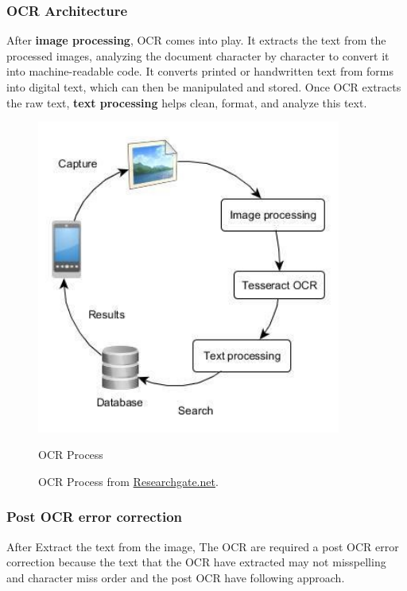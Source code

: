 \documentclass[12pt,oneside,openright,a4paper]{cpe-english-project}
\begin{document}
\subsubsection{OCR Architecture} After \textbf{image processing}, OCR comes into play. It extracts the text from the processed images, analyzing the document character by character to convert it into machine-readable code. It converts printed or handwritten text from forms into digital text, which can then be manipulated and stored. Once OCR extracts the raw text, \textbf{text processing} helps clean, format, and analyze this text.

\begin{figure}[H]
\centering
\includegraphics[width=10cm]{./assets/OCR-Process.png}
\caption{OCR Process}
\caption{OCR Process from 
\href{https://www.researchgate.net/profile/Adrian-Gomez-9/publication/281099638/figure/fig4/AS:614266293997575@1523463905255/Architecture-diagram-for-the-OCR-alternative.png}{Researchgate.net}.}
\label{fig:figure-2.2}
\end{figure}

\subsubsection{Post OCR error correction} After Extract the text from the image, The OCR are required a post OCR error correction because the text that the OCR have extracted may not misspelling and character miss order and the post OCR have following approach.
\end{document}
